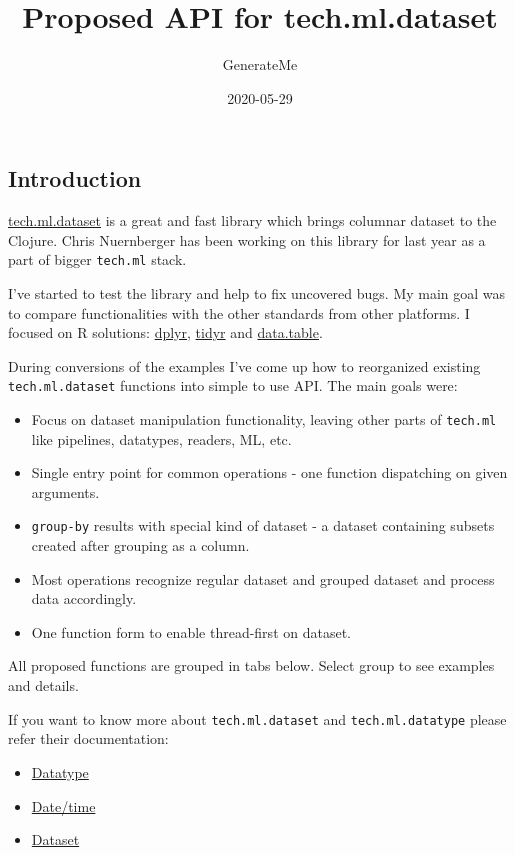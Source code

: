 \documentclass[]{article}
\title{Proposed API for tech.ml.dataset}
\author{GenerateMe}
\date{2020-05-29}
\providecommand{\tightlist}{%
  \setlength{\itemsep}{0pt}\setlength{\parskip}{0pt}}
\begin{document}
\maketitle

\subsection{Introduction}\label{introduction}

\href{https://github.com/techascent/tech.ml.dataset}{tech.ml.dataset} is
a great and fast library which brings columnar dataset to the Clojure.
Chris Nuernberger has been working on this library for last year as a
part of bigger \texttt{tech.ml} stack.

I've started to test the library and help to fix uncovered bugs. My main
goal was to compare functionalities with the other standards from other
platforms. I focused on R solutions:
\href{https://dplyr.tidyverse.org/}{dplyr},
\href{https://tidyr.tidyverse.org/}{tidyr} and
\href{https://rdatatable.gitlab.io/data.table/}{data.table}.

During conversions of the examples I've come up how to reorganized
existing \texttt{tech.ml.dataset} functions into simple to use API. The
main goals were:

\begin{itemize}
\tightlist
\item
  Focus on dataset manipulation functionality, leaving other parts of
  \texttt{tech.ml} like pipelines, datatypes, readers, ML, etc.
\item
  Single entry point for common operations - one function dispatching on
  given arguments.
\item
  \texttt{group-by} results with special kind of dataset - a dataset
  containing subsets created after grouping as a column.
\item
  Most operations recognize regular dataset and grouped dataset and
  process data accordingly.
\item
  One function form to enable thread-first on dataset.
\end{itemize}

All proposed functions are grouped in tabs below. Select group to see
examples and details.

If you want to know more about \texttt{tech.ml.dataset} and
\texttt{tech.ml.datatype} please refer their documentation:

\begin{itemize}
\tightlist
\item
  \href{https://github.com/techascent/tech.datatype/blob/master/docs/cheatsheet.md}{Datatype}
\item
  \href{https://github.com/techascent/tech.datatype/blob/master/docs/datetime.md}{Date/time}
\item
  \href{https://github.com/techascent/tech.ml.dataset/blob/master/docs/walkthrough.md}{Dataset}
\end{itemize}
\end{document}
